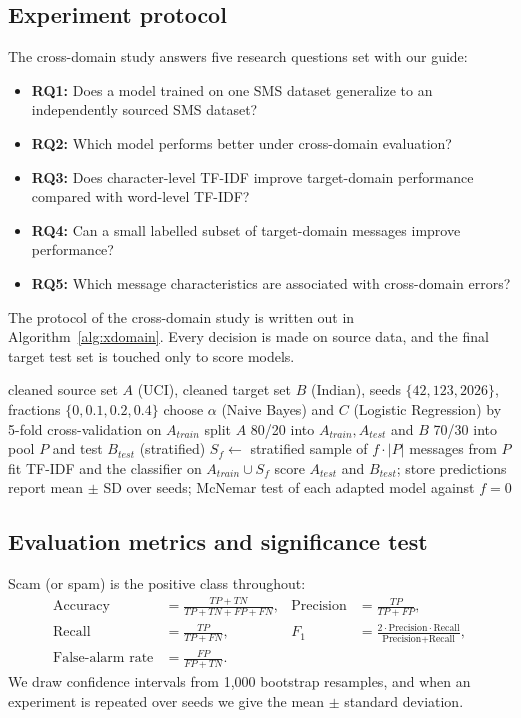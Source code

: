 \subsection{Experiment protocol}
The cross-domain study answers five research questions set with our guide:
\begin{itemize}
\item \textbf{RQ1:} Does a model trained on one SMS dataset generalize to an independently sourced SMS dataset?
\item \textbf{RQ2:} Which model performs better under cross-domain evaluation?
\item \textbf{RQ3:} Does character-level TF-IDF improve target-domain performance compared with word-level TF-IDF?
\item \textbf{RQ4:} Can a small labelled subset of target-domain messages improve performance?
\item \textbf{RQ5:} Which message characteristics are associated with cross-domain errors?
\end{itemize}
The protocol of the cross-domain study is written out in Algorithm~\ref{alg:xdomain}. Every decision is made on source data, and the final target test set is touched only to score models.

\begin{algorithm}[H]
\caption{Cross-domain evaluation and lightweight domain adaptation}
\label{alg:xdomain}
\begin{algorithmic}[1]
\Require cleaned source set $A$ (UCI), cleaned target set $B$ (Indian), seeds $\{42, 123, 2026\}$, fractions $\{0, 0.1, 0.2, 0.4\}$
\State choose $\alpha$ (Naive Bayes) and $C$ (Logistic Regression) by 5-fold cross-validation on $A_{train}$
  \State split $A$ 80/20 into $A_{train}, A_{test}$ and $B$ 70/30 into pool $P$ and test $B_{test}$ (stratified)
    \State $S_f \gets$ stratified sample of $f\cdot|P|$ messages from $P$
    \State fit TF-IDF and the classifier on $A_{train}\cup S_f$
    \State score $A_{test}$ and $B_{test}$; store predictions
  \EndFor
\EndFor
\State report mean $\pm$ SD over seeds; McNemar test of each adapted model against $f=0$
\end{algorithmic}
\end{algorithm}

\subsection{Evaluation metrics and significance test}
Scam (or spam) is the positive class throughout:
\begin{align}
\text{Accuracy}&=\frac{TP+TN}{TP+TN+FP+FN}, & \text{Precision}&=\frac{TP}{TP+FP},\\
\text{Recall}&=\frac{TP}{TP+FN}, & F_1&=\frac{2\cdot\text{Precision}\cdot\text{Recall}}{\text{Precision}+\text{Recall}},\\
\text{False-alarm rate}&=\frac{FP}{FP+TN}. & &
\end{align}
We draw confidence intervals from 1,000 bootstrap resamples, and when an experiment is repeated over seeds we give the mean $\pm$ standard deviation.

